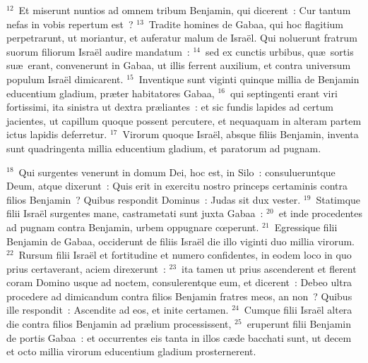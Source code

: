 ${}^{12}$~Et miserunt nuntios ad omnem tribum Benjamin, qui dicerent~: Cur tantum nefas in vobis repertum est~?
${}^{13}$~Tradite homines de Gabaa, qui hoc flagitium perpetrarunt, ut moriantur, et auferatur malum de Isra\"el. Qui noluerunt fratrum suorum filiorum Isra\"el audire mandatum~:
${}^{14}$~sed ex cunctis urbibus, qu\ae\ sortis su\ae\ erant, convenerunt in Gabaa, ut illis ferrent auxilium, et contra universum populum Isra\"el dimicarent.
${}^{15}$~Inventique sunt viginti quinque millia de Benjamin educentium gladium, pr\ae ter habitatores Gabaa,
${}^{16}$~qui septingenti erant viri fortissimi, ita sinistra ut dextra pr\ae liantes~: et sic fundis lapides ad certum jacientes, ut capillum quoque possent percutere, et nequaquam in alteram partem ictus lapidis deferretur.
${}^{17}$~Virorum quoque Isra\"el, absque filiis Benjamin, inventa sunt quadringenta millia educentium gladium, et paratorum ad pugnam.


${}^{18}$~Qui surgentes venerunt in domum Dei, hoc est, in Silo~: consulueruntque Deum, atque dixerunt~: Quis erit in exercitu nostro princeps certaminis contra filios Benjamin~? Quibus respondit Dominus~: Judas sit dux vester.
${}^{19}$~Statimque filii Isra\"el surgentes mane, castrametati sunt juxta Gabaa~:
${}^{20}$~et inde procedentes ad pugnam contra Benjamin, urbem oppugnare cœperunt.
${}^{21}$~Egressique filii Benjamin de Gabaa, occiderunt de filiis Isra\"el die illo viginti duo millia virorum.
${}^{22}$~Rursum filii Isra\"el et fortitudine et numero confidentes, in eodem loco in quo prius certaverant, aciem direxerunt~:
${}^{23}$~ita tamen ut prius ascenderent et flerent coram Domino usque ad noctem, consulerentque eum, et dicerent~: Debeo ultra procedere ad dimicandum contra filios Benjamin fratres meos, an non~? Quibus ille respondit~: Ascendite ad eos, et inite certamen.
${}^{24}$~Cumque filii Isra\"el altera die contra filios Benjamin ad pr\ae lium processissent,
${}^{25}$~eruperunt filii Benjamin de portis Gabaa~: et occurrentes eis tanta in illos c\ae de bacchati sunt, ut decem et octo millia virorum educentium gladium prosternerent.


